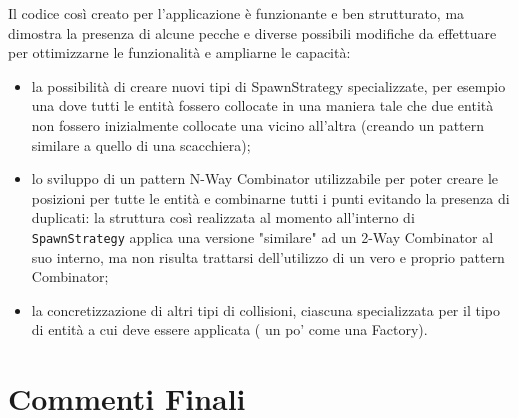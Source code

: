 \documentclass[a4paper,12pt]{report}
\begin{document}
Il codice così creato per l'applicazione è funzionante e ben strutturato, ma dimostra la presenza di alcune pecche e diverse possibili modifiche da effettuare per ottimizzarne le funzionalità e ampliarne le capacità:
\begin{itemize}
    \item la possibilità di creare nuovi tipi di SpawnStrategy specializzate, per esempio una dove tutti le entità fossero collocate in una maniera tale che due entità non fossero inizialmente collocate una vicino all'altra (creando un pattern similare a quello di una scacchiera);
    \item lo sviluppo di un pattern N-Way Combinator utilizzabile per poter creare le posizioni per tutte le entità e combinarne tutti i punti evitando la presenza di duplicati: la struttura così realizzata al momento all'interno di \verb|SpawnStrategy| applica una versione "similare" ad un 2-Way Combinator al suo interno, ma non risulta trattarsi dell'utilizzo di un vero e proprio pattern Combinator;
    \item la concretizzazione di altri tipi di collisioni, ciascuna specializzata per il tipo di entità a cui deve essere applicata ( un po' come una Factory).
\end{itemize}
\chapter{Commenti Finali}
\end{document}
